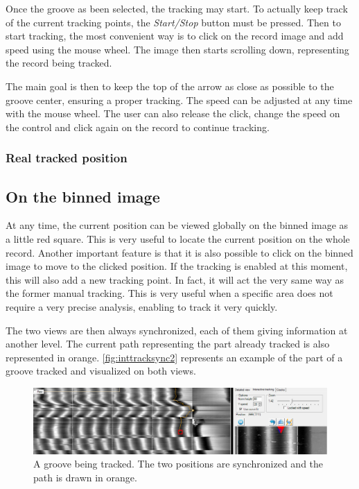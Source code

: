 Once the groove as been selected, the tracking may start. To actually keep track of the current tracking points, the \emph{Start/Stop} button must be pressed. Then to start tracking, the most convenient way is to click on the record image and add speed using the mouse wheel. The image then starts scrolling down, representing the record being tracked.

The main goal is then to keep the top of the arrow as close as possible to the groove center, ensuring a proper tracking. The speed can be adjusted at any time with the mouse wheel. The user can also release the click, change the speed on the control and click again on the record to continue tracking.

\subsubsection{Real tracked position}

\subsection{On the binned image}

At any time, the current position can be viewed globally on the binned image as a little red square. This is very useful to locate the current position on the whole record. Another important feature is that it is also possible to click on the binned image to move to the clicked position. If the tracking is enabled at this moment, this will also add a new tracking point. In fact, it will act the very same way as the former manual tracking. This is very useful when a specific area does not require a very precise analysis, enabling to track it very quickly.

The two views are then always synchronized, each of them giving information at another level. The current path representing the part already tracked is also represented in orange. \autoref{fig:inttracksync2} represents an example of the part of a groove tracked and visualized on both views.

\begin{figure}[!ht]
\centering
\includegraphics[width=1.0\textwidth]{images/int-track-sync-2}
\caption[A groove being tracked.]
{A groove being tracked. The two positions are synchronized and the path is drawn in orange.}
\label{fig:inttracksync2}
\end{figure}

